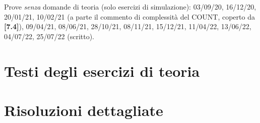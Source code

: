 \documentclass[11pt,a4paper]{article}
\newcommand{\qid}[1]{\textbf{[#1]}}
\begin{document}
Prove \emph{senza} domande di teoria (solo esercizi di simulazione): 03/09/20, 16/12/20,
20/01/21, 10/02/21 (a parte il commento di complessit\`a del COUNT, coperto da \qid{7.4}),
09/04/21, 08/06/21, 28/10/21, 08/11/21, 15/12/21, 11/04/22, 13/06/22, 04/07/22, 25/07/22 (scritto).

\tableofcontents
\newpage

\part{Testi degli esercizi di teoria}


\newpage
\part{Risoluzioni dettagliate}



\end{document}
